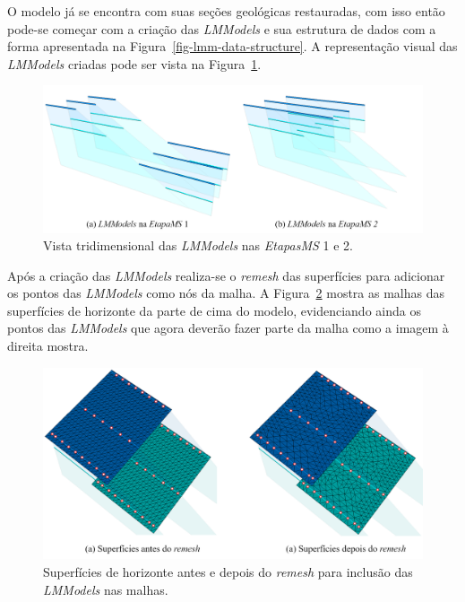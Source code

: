 O modelo já se encontra com suas seções geológicas restauradas, com isso então pode-se começar com a criação das \textit{LMModels} e sua estrutura de dados com a forma apresentada na Figura~\ref{fig-lmm-data-structure}. A representação visual das \textit{LMModels} criadas pode ser vista na Figura~\ref{fig-example-1-2}.

\begin{figure} [h]
  \begin{center}
    \includegraphics[width=\textwidth]{images/fig-example-1-2}
    \caption{Vista tridimensional das \textit{LMModels} nas \textit{EtapasMS} 1 e 2.}\label{fig-example-1-2}
  \end{center}
\end{figure}

Após a criação das \textit{LMModels} realiza-se o \textit{remesh} das superfícies para adicionar os pontos das \textit{LMModels} como nós da malha. A Figura~\ref{fig-example-1-3} mostra as malhas das superfícies de horizonte da parte de cima do modelo, evidenciando ainda os pontos das \textit{LMModels} que agora deverão fazer parte da malha como a imagem à direita mostra.

\begin{figure} [H]
  \begin{center}
    \includegraphics[width=\textwidth]{images/fig-example-1-3}
    \caption{Superfícies de horizonte antes e depois do \textit{remesh} para inclusão das \textit{LMModels} nas malhas.}\label{fig-example-1-3}
  \end{center}
\end{figure}

